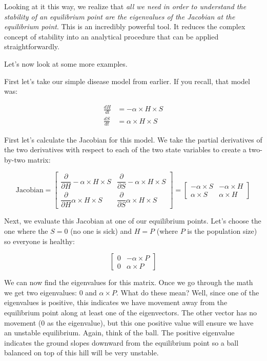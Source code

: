 \documentclass[]{memoir}
\begin{document}
Looking at it this way, we realize that \emph{all we need in order to
understand the stability of an equilibrium point are the eigenvalues of
the Jacobian at the equilibrium point}. This is an incredibly powerful
tool. It reduces the complex concept of stability into an analytical
procedure that can be applied straightforwardly.

Let's now look at some more examples.

First let's take our simple disease model from earlier. If you recall,
that model was:

\[
\begin{aligned}
\frac{dH}{dt} &= - \alpha \times H \times S \\ 
\frac{dS}{dt} &= \alpha \times H \times S
\end{aligned}
\]

First let's calculate the Jacobian for this model. We take the partial
derivatives of the two derivatives with respect to each of the two state
variables to create a two-by-two matrix:

\[
\text{Jacobian} = \begin{bmatrix} \dfrac{\partial}{\partial H }  - \alpha \times H \times S& \dfrac{\partial}{\partial S }  - \alpha \times H \times S  \\  \dfrac{\partial}{\partial H } \alpha \times H \times S & \dfrac{\partial}{\partial S } \alpha \times H \times S \end{bmatrix} =\begin{bmatrix}
-\alpha \times S & -\alpha \times H \\
\alpha \times S & \alpha \times H
\end{bmatrix}
\]

Next, we evaluate this Jacobian at one of our equilibrium points. Let's
choose the one where the $S=0$ (no one is sick) and $H=P$ (where $P$ is
the population size) so everyone is healthy:

\[
\begin{bmatrix}
0 & -\alpha \times P \\
0 & \alpha \times P
\end{bmatrix}
\]

We can now find the eigenvalues for this matrix. Once we go through the
math we get two eigenvalues: 0 and $\alpha \times P$. What do these
mean? Well, since one of the eigenvalues is positive, this indicates we
have movement away from the equilibrium point along at least one of the
eigenvectors. The other vector has no movement (0 as the eigenvalue),
but this one positive value will ensure we have an unstable equilibrium.
Again, think of the ball. The positive eigenvalue indicates the ground
slopes downward from the equilibrium point so a ball balanced on top of
this hill will be very unstable.
\end{document}
